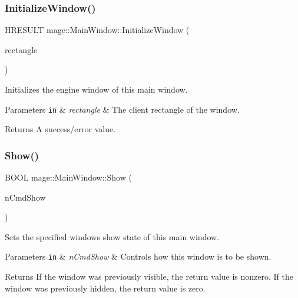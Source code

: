 \subsubsection{\texorpdfstring{Initialize\+Window()}{InitializeWindow()}\hspace{0.1cm}{\footnotesize\ttfamily [2/2]}}
{\footnotesize\ttfamily H\+R\+E\+S\+U\+LT mage\+::\+Main\+Window\+::\+Initialize\+Window (\begin{DoxyParamCaption}\item[{R\+E\+CT}]{rectangle }\end{DoxyParamCaption})\hspace{0.3cm}{\ttfamily [protected]}}

Initializes the engine window of this main window.


\begin{DoxyParams}[1]{Parameters}
\mbox{\tt in}  & {\em rectangle} & The client rectangle of the window. \\
\hline
\end{DoxyParams}
\begin{DoxyReturn}{Returns}
A success/error value. 
\end{DoxyReturn}
\hypertarget{classmage_1_1_main_window_a78cd939882d89a40a1cdd9308253811d}{}\label{classmage_1_1_main_window_a78cd939882d89a40a1cdd9308253811d} 
\subsubsection{\texorpdfstring{Show()}{Show()}}
{\footnotesize\ttfamily B\+O\+OL mage\+::\+Main\+Window\+::\+Show (\begin{DoxyParamCaption}\item[{int}]{n\+Cmd\+Show }\end{DoxyParamCaption})\hspace{0.3cm}{\ttfamily [protected]}}

Sets the specified window\textquotesingle{}s show state of this main window.


\begin{DoxyParams}[1]{Parameters}
\mbox{\tt in}  & {\em n\+Cmd\+Show} & Controls how this window is to be shown. \\
\hline
\end{DoxyParams}
\begin{DoxyReturn}{Returns}
If the window was previously visible, the return value is nonzero. If the window was previously hidden, the return value is zero. 
\end{DoxyReturn}
\hypertarget{classmage_1_1_main_window_aa1ba43fc0a12ea43636fe0e62242a47d}{}\label{classmage_1_1_main_window_aa1ba43fc0a12ea43636fe0e62242a47d} 
